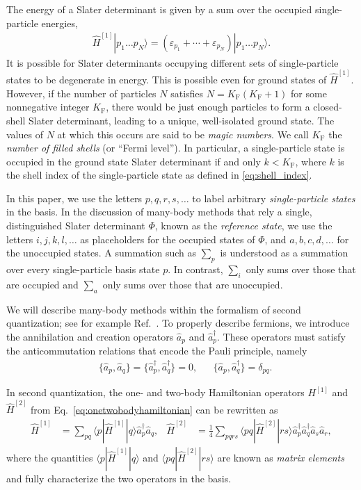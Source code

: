 The energy of a Slater determinant is given by a sum over the occupied single-particle energies,
\begin{align*}
  \hat{H}^{[1]} | p_1 \ldots p_N \rangle = (\varepsilon_{p_1} + \cdots + \varepsilon_{p_N}) | p_1 \ldots p_N \rangle.
\end{align*}
It is possible for Slater determinants occupying different sets of single-particle states to be degenerate in energy.  This is possible even for ground states of $\hat{H}^{[1]}$.  However, if the number of particles $N$ satisfies $N = K_{\mathrm{F}} (K_{\mathrm{F}} + 1)$ for some nonnegative integer $K_{\mathrm{F}}$, there would be just enough particles to form a closed-shell Slater determinant, leading to a unique, well-isolated ground state.  The values of $N$ at which this occurs are said to be \textit{magic numbers}.  We call $K_{\mathrm{F}}$ the \textit{number of filled shells} (or ``Fermi level'').  In particular, a single-particle state is occupied in the ground state Slater determinant if and only $k < K_{\mathrm{F}}$, where $k$ is the shell index of the single-particle state as defined in \eqref{eq:shell_index}.

In this paper, we use the letters $p, q, r, s, \ldots$ to label arbitrary \textit{single-particle states} in the basis.  In the discussion of many-body methods that rely a single, distinguished Slater determinant $\Phi$, known as the \textit{reference state}, we use the letters $i, j, k, l, \ldots$ as placeholders for the occupied states of $\Phi$, and $a, b, c, d, \ldots$ for the unoccupied states.  A summation such as $\sum_p$ is understood as a summation over every single-particle basis state $p$.  In contrast, $\sum_i$ only sums over those that are occupied and $\sum_a$ only sums over those that are unoccupied.

We will describe many-body methods within the formalism of second quantization; see for example Ref.\ \cite{shavitt2009many}.  To properly describe fermions, we introduce the annihilation and creation operators $\hat a_p$ and $\hat a_p^\dagger$. These operators must satisfy the anticommutation relations that encode the Pauli principle, namely
\begin{align*}
  &\{\hat a_p, \hat a_q\} = \{\hat a_p^\dagger, \hat a_q^\dagger\} = 0, &
  &\{\hat a_p, \hat a_q^\dagger\} = \delta_{p q}.
\end{align*}

In second quantization, the one- and two-body Hamiltonian operators $H^{[1]}$ and $\hat{H}^{[2]}$ from Eq.\ \eqref{eq:onetwobodyhamiltonian} can be rewritten as
\begin{align} \label{eq:second_quantized_hamiltonian}
  \hat H^{[1]} &= \sum_{p q} \langle p | \hat{H}^{[1]} | q \rangle \hat a_p^\dagger \hat a_q^{}, &
  \hat{H}^{[2]} &= \frac{1}{4} \sum_{p q r s} \langle p q | \hat{H}^{[2]} | r s \rangle \hat a_p^\dagger \hat a_q^\dagger \hat a_s^{} \hat a_r^{},
\end{align}
where the quantities $\langle p | \hat{H}^{[1]} | q \rangle$ and $\langle p q | \hat{H}^{[2]} | r s \rangle$ are known as \textit{matrix elements} and fully characterize the two operators in the basis.

